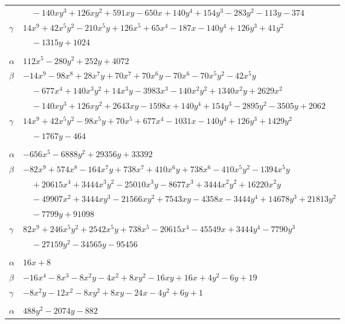 \documentclass[11pt]{article}
\begin{document}
\begin{longtable}{@{}ll@{}}
 & $\quad -140xy^{3}+126xy^{2}+591xy-650x+140y^{4}+154y^{3}-283y^{2}-113y-374$\\
$\gamma$ & $14x^{9}+42x^{5}y^{2}-210x^{5}y+126x^{5}+65x^{4}-187x-140y^{4}+126y^{3}+41y^{2}$\\
 & $\quad -1315y+1024$\\
\addlinespace[3pt]
\multicolumn{2}{@{}l}{$\{i,j\}=\{21,33\}$, $k_{ij}=2^{10}\cdot 3\cdot 5$}\\
$\alpha$ & $112x^{5}-280y^{2}+252y+4072$\\
$\beta$ & $-14x^{9}-98x^{8}+28x^{7}y+70x^{7}+70x^{6}y-70x^{6}-70x^{5}y^{2}-42x^{5}y$\\
 & $\quad -677x^{4}+140x^{3}y^{2}+14x^{3}y-3983x^{3}-140x^{2}y^{2}+1340x^{2}y+2629x^{2}$\\
 & $\quad -140xy^{3}+126xy^{2}+2643xy-1598x+140y^{4}+154y^{3}-2895y^{2}-3505y+2062$\\
$\gamma$ & $14x^{9}+42x^{5}y^{2}-98x^{5}y+70x^{5}+677x^{4}-1031x-140y^{4}+126y^{3}+1429y^{2}$\\
 & $\quad -1767y-464$\\
\addlinespace[3pt]
\multicolumn{2}{@{}l}{$\{i,j\}=\{22,27\}$, $k_{ij}=2^{7}\cdot 3\cdot 5\cdot 13^{2}$}\\
$\alpha$ & $-656x^{5}-6888y^{2}+29356y+33392$\\
$\beta$ & $-82x^{9}+574x^{8}-164x^{7}y+738x^{7}+410x^{6}y+738x^{6}-410x^{5}y^{2}-1394x^{5}y$\\
 & $\quad +20615x^{4}+3444x^{3}y^{2}-25010x^{3}y-8677x^{3}+3444x^{2}y^{2}+16220x^{2}y$\\
 & $\quad -49907x^{2}+3444xy^{3}-21566xy^{2}+7543xy-4358x-3444y^{4}+14678y^{3}+21813y^{2}$\\
 & $\quad -7799y+91098$\\
$\gamma$ & $82x^{9}+246x^{5}y^{2}+2542x^{5}y+738x^{5}-20615x^{4}-45549x+3444y^{4}-7790y^{3}$\\
 & $\quad -27159y^{2}-34565y-95456$\\
\addlinespace[3pt]
\multicolumn{2}{@{}l}{$\{i,j\}=\{23,28\}$, $k_{ij}=3\cdot 5$}\\
$\alpha$ & $16x+8$\\
$\beta$ & $-16x^{4}-8x^{3}-8x^{2}y-4x^{2}+8xy^{2}-16xy+16x+4y^{2}-6y+19$\\
$\gamma$ & $-8x^{2}y-12x^{2}-8xy^{2}+8xy-24x-4y^{2}+6y+1$\\
\addlinespace[3pt]
\multicolumn{2}{@{}l}{$\{i,j\}=\{23,29\}$, $k_{ij}=2^{3}$}\\
$\alpha$ & $488y^{2}-2074y-882$\\

\end{longtable}
\end{document}
